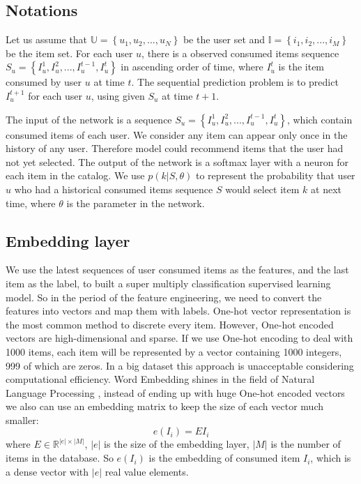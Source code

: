 \documentclass[runningheads]{llncs}
\begin{document}
\subsection{Notations }\label{AA}
Let us assume that $\mathbb{U}= \left \{ u_{1},u_{2},...,u_{N} \right \}\label{eq}$ be the user set and $\mathbb{I}= \left \{ i_{1},i_{2},...,i_{M} \right \}$ be the item set. For each user $u$, there is a observed consumed items sequence $S_{u}=\left \{ I_{u}^{1},I_{u}^{2},...,I_{u}^{t-1},I_{u}^{t} \right \}$ in ascending order of time, where $I_{u}^{t}$ is the item consumed by user $u$ at time $t$. The sequential prediction problem is to predict $I_{u}^{t+1}$ for each user $u$, using given $S_{u}$ at time $t+1$.

The input of the network is a sequence $S_{u}=\left \{ I_{u}^{1},I_{u}^{2},...,I_{u}^{t-1},I_{u}^{t} \right \}$, which contain consumed items of each user. We consider any item can appear only once in the history of any user. Therefore model could recommend items that the user had not yet selected. The output of the network is a softmax layer with a neuron for each item in the catalog. We use $p(k|S,\theta )$ to represent the probability that user $u$ who had a historical consumed items sequence $S$ would select item $k$ at next time, where $\theta$ is the parameter in the network.

\subsection{Embedding layer}
 We use the latest sequences of user consumed items as the features, and the last item as the label, to built a super multiply classification supervised learning model. So in the period of the feature engineering, we need to convert the features into vectors and map them with labels. One-hot vector representation is the most common method to discrete every item. However, One-hot encoded vectors are high-dimensional and sparse. If we use One-hot encoding to deal with 1000 items, each item will be represented by a vector containing 1000 integers, 999 of which are zeros. In a big dataset this approach is unacceptable considering computational efficiency. Word Embedding shines in the field of Natural Language Processing , instead of ending up with huge One-hot encoded vectors we also can use an embedding matrix to keep the size of each vector much smaller:
 \begin{equation}
e(I_{i})=EI_{i}
\end{equation}
where $E\in \mathbb{R}^{|e|\times |M|}$, $|e|$ is the size of the embedding layer, $|M|$ is the number of items in the database. So $e(I_{i})$ is the embedding of consumed item $I_{i}$, which is a dense vector with $|e|$ real value elements.
\end{document}

